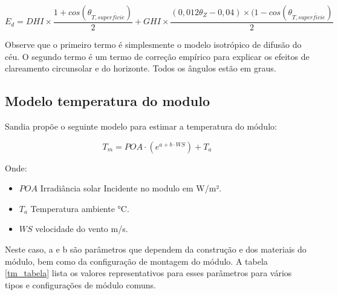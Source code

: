 \begin{equation}
    E_{d} = DHI \times \frac{1 + cos(\theta_{T, superf\acute{i}cie})}{2} + GHI \times \frac{(0,012 \theta_Z - 0,04) \times (1 - cos(\theta_{T, superf\acute{i}cie})}{2}
    \label{eq:ed_emp}
\end{equation}

Observe que o primeiro termo é simplesmente o modelo isotrópico de difusão do céu. O segundo termo é um termo de correção empírico para explicar os efeitos de clareamento circunsolar e do horizonte. Todos os ângulos estão em graus.

\subsection{Modelo temperatura do modulo}

Sandia propõe o seguinte modelo para estimar a temperatura do módulo:

\begin{equation}
    T_m = POA \cdot (e^{a + b \cdot WS}) + T_a
    \label{eq:tm}
\end{equation}

Onde:

\begin{itemize}
  \item $POA$ Irradiância solar Incidente no modulo em W/m².

  \item $T_a$ Temperatura ambiente °C.
  
  \item $WS$ velocidade do vento m/s.
\end{itemize}

Neste caso, a e b são parâmetros que dependem da construção e dos materiais do módulo, bem como da configuração de montagem do módulo. A tabela \ref{tm_tabela} lista os valores representativos para esses parâmetros para vários tipos e configurações de módulo comuns.


